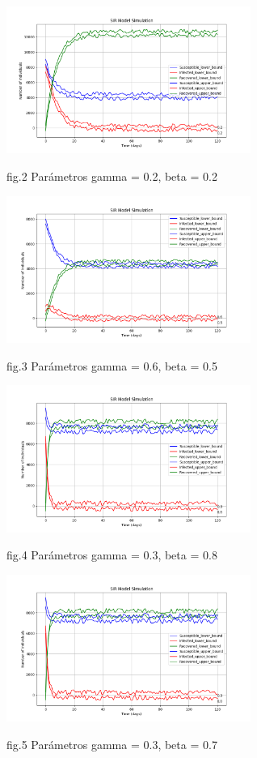         \begin{center}
            \includegraphics[width=0.6\textwidth]{images/plot0.png}
            \begin{center}
               fig.2 Parámetros  gamma = 0.2, beta = 0.2
            \end{center}
            
            \includegraphics[width=0.6\textwidth]{images/plot1.png}
            \begin{center}
                fig.3 Parámetros  gamma = 0.6, beta = 0.5
            \end{center}
            
            \includegraphics[width=0.6\textwidth]{images/plot2.png}
            \begin{center}
                fig.4 Parámetros  gamma = 0.3, beta = 0.8
            \end{center}
            
            \includegraphics[width=0.6\textwidth]{images/plot2.png}
            \begin{center}
                fig.5 Parámetros  gamma = 0.3, beta = 0.7
            \end{center}
    \end{center}


